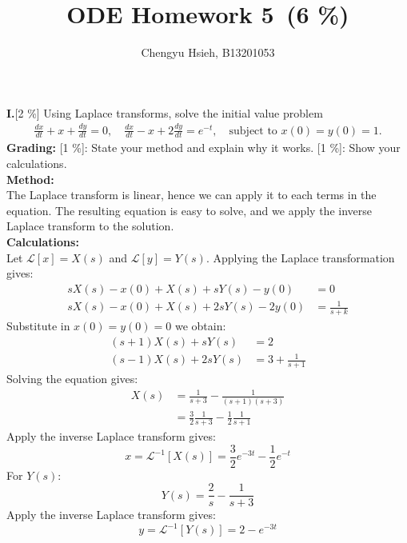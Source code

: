 \documentclass[A4paper,12pt]{article}
\title{ODE Homework 5\, (6 \%)}
\author{Chengyu Hsieh, B13201053}
\date{}
\theoremstyle{definition}
\numberwithin{equation}{section}
\begin{document}
\maketitle
\textbf{I.}[2 \%]
Using Laplace transforms, solve the initial value problem
\begin{align*}
\frac{dx}{dt}+x+\frac{dy}{dt}=0,\quad \frac{dx}{dt}-x+2\frac{dy}{dt}=e^{-t}, \quad \text{subject to } x(0)=y(0)=1.
\end{align*}
\textbf{Grading:}
[1 \%]: State your method and explain why it works.
[1 \%]: Show your calculations.
\vspace{20pt}
\\
\textbf{Method:}\\
The Laplace transform is linear, hence we can apply it to each terms in the equation. 
The resulting equation is easy to solve, and we apply the inverse Laplace transform to the solution.
\\
\textbf{Calculations:}\\
Let $\mathcal{L}[x] = X(s)$ and $\mathcal{L}[y] = Y(s)$.
Applying the Laplace transformation gives:
\begin{align*}
sX(s) - x(0) + X(s) + sY(s) - y(0) &= 0 \\
sX(s) - x(0) + X(s) + 2sY(s) - 2y(0) &= \frac{1}{s+k}
\end{align*}
Substitute in $x(0) = y(0) = 0$ we obtain:
\begin{align*}
(s+1)X(s) + sY(s) &= 2 \\
(s-1)X(s) + 2sY(s) &= 3+\frac{1}{s+1}
\end{align*}
Solving the equation gives:
\begin{align*}
X(s) &= \frac{1}{s+3} - \frac{1}{(s+1)(s+3)} \\
&= \frac{3}{2} \frac{1}{s+3} - \frac{1}{2} \frac{1}{s+1}
\end{align*}
Apply the inverse Laplace transform gives:
$$x = \mathcal{L}^{-1}[X(s)] = \frac{3}{2} e^{-3t} - \frac{1}{2} e^{-t}$$
For $Y(s)$:
$$Y(s) = \frac{2}{s} - \frac{1}{s+3}$$
Apply the inverse Laplace transform gives:
$$y = \mathcal{L}^{-1}[Y(s)] = 2-e^{-3t}$$
\\
\end{document}
